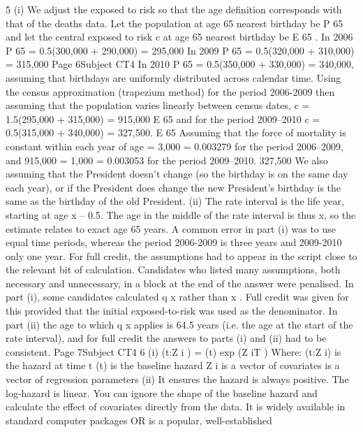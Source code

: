 5
(i)
We adjust the exposed to risk so that the age definition corresponds with that of the
deaths data.
Let the population at age 65 nearest birthday be P 65 and let the central exposed to risk
c
at age 65 nearest birthday be E 65
.
In 2006 P 65 = 0.5(300,000 + 290,000) = 295,000
In 2009 P 65 = 0.5(320,000 + 310,000) = 315,000
Page 6Subject CT4 %
In 2010 P 65 = 0.5(350,000 + 330,000) = 340,000,
assuming that birthdays are uniformly distributed across calendar time.
Using the census approximation (trapezium method) for the period 2006-2009 then
assuming that the population varies linearly between census dates,
c
= 1.5(295,000 + 315,000) = 915,000
E 65
and for the period 2009–2010
c
= 0.5(315,000 + 340,000) = 327,500.
E 65
Assuming that the force of mortality is constant within each year of age
 = 3,000
= 0.003279 for the period 2006–2009, and
915,000
 = 1,000
= 0.003053 for the period 2009–2010.
327,500
We also assuming that the President doesn't change (so the birthday is on the same
day each year), or if the President does change the new President’s birthday is the
same as the birthday of the old President.
(ii)
The rate interval is the life year, starting at age x – 0.5.
The age in the middle of the rate interval is thus x, so the estimate relates
to exact age 65 years.
A common error in part (i) was to use equal time periods, whereas the period 2006-2009 is three years and 2009-2010 only one year. For full credit, the assumptions had to appear in
the script close to the relevant bit of calculation. Candidates who listed many assumptions, both necessary and unnecessary, in a block at the end of the answer were penalised. In part
(i), some candidates calculated q x rather than \mu x . Full credit was given for this provided that the initial exposed-to-risk was used as the denominator. In part (ii) the age to which q x
applies is 64.5 years (i.e. the age at the start of the rate interval), and for full credit the answers to parts (i) and (ii) had to be consistent.
Page 7Subject CT4 %
6
(i)
\lambda(t:Z i ) =  (t) exp (\beta Z iT )
Where:
\lambda(t:Z i) is the hazard at time t
 (t) is the baseline hazard
Z i is a vector of covariates
\beta is a vector of regression parameters
(ii)
It ensures the hazard is always positive.
The log-hazard is linear.
You can ignore the shape of the baseline hazard and calculate the effect of covariates
directly from the data.
It is widely available in standard computer packages OR is a popular, well-established
